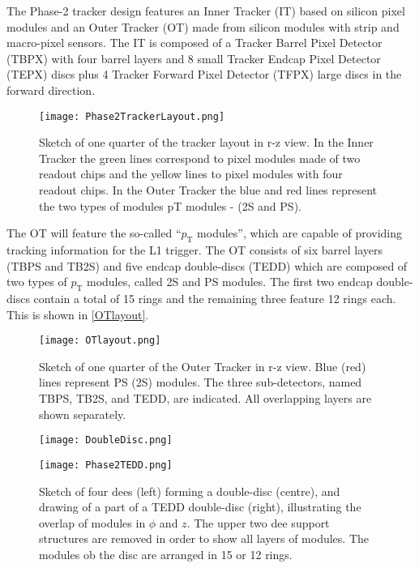 The Phase-2 tracker design features an Inner Tracker (IT) based on silicon pixel modules and an Outer Tracker (OT) made from silicon modules with strip and macro-pixel sensors. The IT is composed of a Tracker Barrel Pixel Detector (TBPX) with four barrel layers and 8 small Tracker Endcap Pixel Detector (TEPX) discs plus 4 Tracker Forward Pixel Detector (TFPX) large discs in the forward direction.

\begin{figure}[H]
\begin{center}
\texttt{[image: Phase2TrackerLayout.png]} 
\caption{ Sketch of one quarter of the tracker layout in r-z view. In the Inner Tracker the green lines correspond to pixel modules made of two readout chips and the yellow lines to pixel modules with four readout chips. In the Outer Tracker the blue and red lines represent the two types of modules pT modules - (2S and PS).}
\label{Phase2TrackerLayout} 
\end{center}
\end{figure}

The OT will feature the so-called ``$p_\text{T}$ modules'', which are capable of providing tracking information for the L1 trigger. The OT consists of six barrel layers (TBPS and TB2S) and five endcap double-discs (TEDD) which are composed of two types of $p_\text{T}$ modules, called 2S and PS modules. The first two endcap double-discs contain a total of 15 rings and the remaining three feature 12 rings each. This is shown in \autoref{OTlayout}.

\begin{figure}[H]
\begin{center}
\texttt{[image: OTlayout.png]} 
\caption{Sketch of one quarter of the Outer Tracker in r-z view. Blue (red) lines represent PS (2S) modules. The three sub-detectors, named TBPS, TB2S, and TEDD, are indicated. All overlapping layers are shown separately.}
\label{OTlayout} 
\end{center}
\end{figure}

\begin{figure}[tb]
\begin{center}
\begin{minipage}[b]{0.45\textwidth}
\texttt{[image: DoubleDisc.png]} 
\end{minipage}
\hspace{1em}
\begin{minipage}[b]{0.45\textwidth}
\texttt{[image: Phase2TEDD.png]} 
\end{minipage}
\caption{Sketch of four dees (left) forming a double-disc (centre), and drawing of a part of a TEDD double-disc (right), illustrating the overlap of modules in $\phi$ and $z$. The upper two dee support structures are removed in order to show all layers of modules. The modules ob the disc are arranged in 15 or 12 rings.}
\label{Dees} 
\end{center}
\end{figure}

